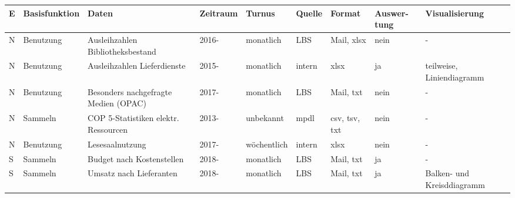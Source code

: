 \begin{table}[H]
    \centering
    \large
    \begin{adjustbox}{max width=\textwidth}
    \begin{tabular}{p{}p{}p{}p{}p{}p{}p{}p{}p{}}
       \toprule
       \textbf{E\footnotemark} &\textbf{Basisfunktion}               &\textbf{Daten}                                 &\textbf{Zeitraum} &\textbf{Turnus}    &\textbf{Quelle}  &\textbf{Format}          &\textbf{Auswer-tung} & \textbf{Visualisierung}\\
       \midrule     
            N         &Benutzung                      & Ausleihzahlen Bibliotheksbestand              & 2016-             & monatlich         & LBS          & Mail, xlsx                & nein  & -\\
            N         &Benutzung                      & Ausleihzahlen Lieferdienste                   & 2015-             & monatlich         & intern       & xlsx                      & ja    & teilweise, Liniendiagramm\\ 
            N         &Benutzung                      & Besonders nachgefragte Medien (OPAC)          & 2017-             & monatlich         & LBS          & Mail, txt                 & nein  & -\\ 
            N         &Sammeln                       &\acrshort{COP 5}-Statistiken elektr. Ressourcen& 2013-            & unbekannt                 & mpdl         & csv, tsv, txt             & nein  & -\\ 
            N         &Benutzung                      & Lesesaalnutzung                               & 2017-             & wöchentlich       & intern       & xlsx                      & nein  & -\\ 
            S         &Sammeln                       & Budget nach Kostenstellen                   & 2018-               & monatlich         & LBS          & Mail, txt                 & ja    & -\\ 
            S         &Sammeln                       & Umsatz nach Lieferanten                     & 2018-               & monatlich         & LBS          & Mail, txt                 & ja    & Balken- und Kreisddiagramm\\ 

\end{tabular}
\end{adjustbox}
\end{table}
